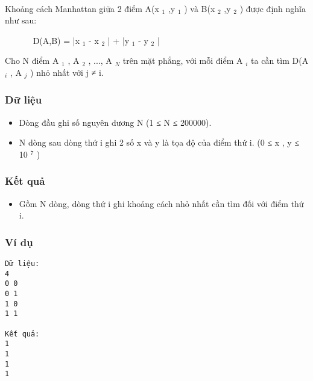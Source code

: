 

 

Khoảng cách Manhattan giữa 2 điểm A(x $_ 1 $ ,y $_ 1 $ ) và B(x $_ 2 $ ,y $_ 2 $ ) được định nghĩa như sau:

        D(A,B) = |x $_ 1 $ - x $_ 2 $ | + |y $_ 1 $ - y $_ 2 $ |

Cho N điểm A $_ 1 $ , A $_ 2 $ , ..., A $_ N $ trên mặt phẳng, với mỗi điểm A $_ i $ ta cần tìm D(A $_ i $ , A $_ j $ ) nhỏ nhất với j ≠ i.

\subsubsection{Dữ liệu}
\begin{itemize}
	\item Dòng đầu ghi số nguyên dương N (1 ≤ N ≤ 200000).
	\item N dòng sau dòng thứ i ghi 2 số x và y là tọa độ của điểm thứ i. (0 ≤ x , y ≤ 10 $^ 7 $ )
\end{itemize}

\subsubsection{Kết quả}
\begin{itemize}
	\item Gồm N dòng, dòng thứ i ghi khoảng cách nhỏ nhất cần tìm đối với điểm thứ i.
\end{itemize}

\subsubsection{Ví dụ}
\begin{verbatim}
Dữ liệu:
4
0 0
0 1
1 0
1 1

Kết quả:
1
1
1
1
\end{verbatim}